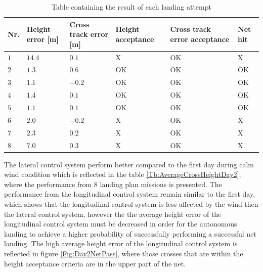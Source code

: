 \begin{table}[H]
\centering
\begin{tabular}{| p{0.5cm} | p{1cm} | p{1cm} | p{3.5cm} | p{3cm} | p{1cm} |}
\hline
\textbf{Nr.}	& \textbf{Height error [m]}	& \textbf{Cross track error [m]}& \textbf{Height acceptance}& \textbf{Cross track error acceptance}	& \textbf{Net hit}\\ \hline
$1$				& $14.4$		& $0.1$		& X								& OK									& X					\\ \hline
$2$				& $1.3$		& $0.6$	& OK								& OK										& OK					\\ \hline
$3$				& $1.1$		& $-0.2$	& OK							& OK									& OK				\\ \hline
$4$				& $1.4$		& $0.1$		& OK							& OK										& OK					\\ \hline
$5$				& $1.1$		& $0.1$		& OK							& OK										& OK					\\ \hline
$6$				& $2.0$		& $-0.2$	& X								& OK									& X					\\ \hline
$7$				& $2.3$		& $0.2$		& X								& OK									& X				\\ \hline
$8$				& $7.0$	& $0.3$			& X										& OK										& X					\\ \hline
\end{tabular}
\caption{Table containing the result of each landing attempt}
\label{tb:Day2LandingAttempt}
\end{table}
The lateral control system perform better compared to the first day during calm wind condition which is reflected in the table \ref{Tb:AverageCrossHeightDay2}, where the performance from 8 landing plan missions is presented. The performance from the longitudinal control system remain similar to the first day, which shows that the longitudinal control system is less affected by the wind then the lateral control system, however the the average height error of the longitudinal control system must be decreased in order for the autonomous landing to achieve a higher probability of successfully performing a successful net landing. The high average height error of the longitudinal control system is reflected in figure \ref{Fig:Day2NetPass}, where those crosses that are within the height acceptance criteria are in the upper part of the net.
